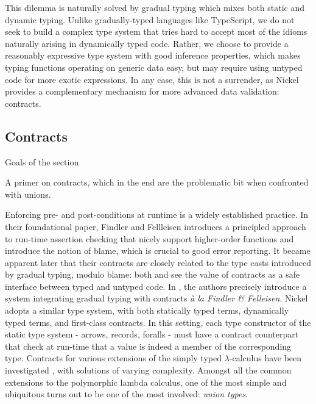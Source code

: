\documentclass{article}
\begin{document}
This dilemma is naturally solved by gradual typing\cite{Siek06gradualtyping}
which mixes both static and dynamic typing. Unlike gradually-typed languages
like TypeScript, we do not seek to build a complex type system that tries hard
to accept most of the idioms naturally arising in dynamically typed code.
Rather, we choose to provide a reasonably expressive type system with good
inference properties, which makes typing functions operating on generic data easy,
but may require using untyped code for more exotic expressions.  In any case,
this is not a surrender, as Nickel provides a complementary mechanism for more
advanced data validation: contracts.

\subsection{Contracts}
\color{red}Goals of the section

A primer on contracts, which in the end are the problematic bit when confronted
with unions.\vspace{0.5cm}

\color{black}

Enforcing pre- and post-conditions at runtime is a widely established practice.
In their foundational paper\cite{FindlerFelleisenHOContracts}, Findler and
Fellleisen introduces a principled approach to run-time assertion checking that
nicely support higher-order functions and introduce the notion of blame, which
is crucial to good error reporting. It became apparent later that their
contracts are closely related to the type casts introduced by gradual typing,
modulo blame: both \cite{FindlerMultiLang} and \cite{FelleisenInterLang} see the
value of contracts as a safe interface between typed and untyped code. In
\cite{WellTypedBlamed}, the authors precisely introduce a system integrating
gradual typing with contracts \textit{à la Findler \& Felleisen}. Nickel adopts
a similar type system, with both statically typed terms, dynamically typed
terms, and first-class contracts.  In this setting, each type constructor of the
static type system - arrows, records, foralls - must have a contract counterpart
that check at run-time that a value is indeed a member of the corresponding
type. Contracts for various extensions of the simply typed $\lambda$-calculus
have been investigated \cite{BlameForAll, KeilThiemannUnionIntersection,
RootCauseOfBlame, DependentContracts, GradualTypingClasses}, with solutions of
varying complexity.  Amongst all the common extensions to the polymorphic lambda
calculus, one of the most simple and ubiquitous turns out to be one of the most
involved: \emph{union types}.
\end{document}
